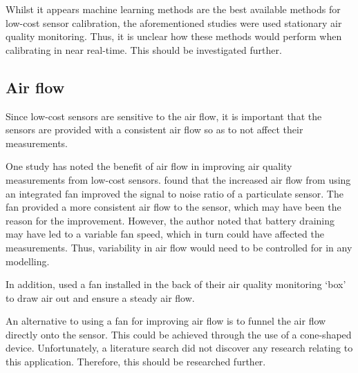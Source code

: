 \documentclass[11pt,twosided,a4paper]{report}
\begin{document}
Whilst it appears machine learning methods are the best available methods for low-cost sensor calibration, the aforementioned studies were used stationary air quality monitoring. Thus, it is unclear how these methods would perform when calibrating in near real-time. This should be investigated further.



\subsection{Air flow} \label{air_flow}

Since low-cost sensors are sensitive to the air flow, it is important that the sensors are provided with a consistent air flow so as to not affect their measurements.

One study has noted the benefit of air flow in improving air quality measurements from low-cost sensors. \cite{thorpe2017RPimesh} found that the increased air flow from using an integrated fan improved the signal to noise ratio of a particulate sensor. The fan provided a more consistent air flow to the sensor, which may have been the reason for the improvement. However, the author noted that battery draining may have led to a variable fan speed, which in turn could have affected the measurements. Thus, variability in air flow would need to be controlled for in any modelling.

In addition, \cite{Hasenfratz2015highresmapsTram} used a fan installed in the back of their air quality monitoring `box' to draw air out and ensure a steady air flow.

An alternative to using a fan for improving air flow is to funnel the air flow directly onto the sensor. This could be achieved through the use of a cone-shaped device. Unfortunately, a literature search did not discover any research relating to this application. Therefore, this should be researched further.




\end{document}
